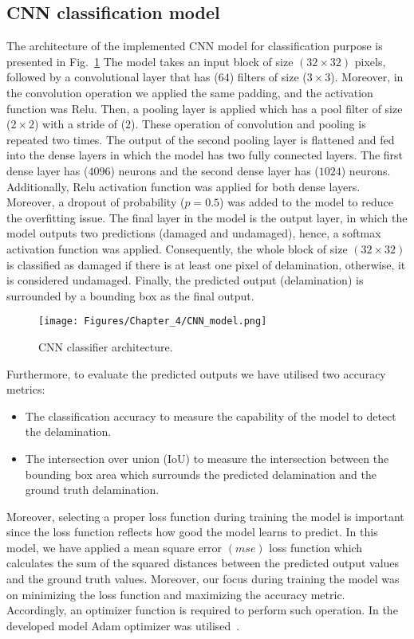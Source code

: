 \subsection{CNN classification model}
The architecture of the implemented CNN model for classification purpose is presented in Fig.~\ref{CNN_model}
The model takes an input block of size \((32\times 32)\) pixels, followed by a convolutional layer that has (\(64\)) filters of size (\(3\times 3\)).
Moreover, in the convolution operation we applied the same padding, and the activation function was Relu.
Then, a pooling layer is applied which has a pool filter of size (\(2\times 2\)) with a stride of (\(2\)).
These operation of convolution and pooling is repeated two times.
The output of the second pooling layer is flattened and fed into the dense layers in which the model has two fully connected layers.
The first dense layer has (\(4096\)) neurons and the second dense layer has (\(1024\)) neurons.
Additionally, Relu activation function was applied for both dense layers.
Moreover, a dropout of probability (\(p = 0.5\)) was added to the model to reduce the overfitting issue.
The final layer in the model is the output layer, in which the model outputs two predictions (damaged and undamaged), hence, a softmax activation function was applied. 
Consequently, the whole block of size \((32\times 32)\) is classified as damaged if there is at least one pixel of delamination, otherwise, it is considered undamaged.
Finally, the predicted output (delamination) is surrounded by a bounding box as the final output.
\begin{figure}[h!]
	\centering
	\texttt{[image: Figures/Chapter\_4/CNN\_model.png]}
	\caption{CNN classifier architecture.}
	\label{CNN_model}
\end{figure}

Furthermore, to evaluate the predicted outputs we have utilised two accuracy metrics:
\begin{itemize}
	\item The classification accuracy to measure the capability of the model to detect the delamination.
	\item The intersection over union (IoU) to measure the intersection between the bounding box area which surrounds the predicted delamination and the ground truth delamination.
\end{itemize}

Moreover, selecting a proper loss function during training the model is important since the loss function reflects how good the model learns to predict.
In this model, we have applied a mean square error \((mse)\) loss function which calculates the sum of the squared distances between the predicted output values and the ground truth values.
Moreover, our focus during training the model was on minimizing the loss function and maximizing the accuracy metric.
Accordingly, an optimizer function is required to perform such operation.
In the developed model Adam optimizer was utilised~\cite{Kingma2015}. 